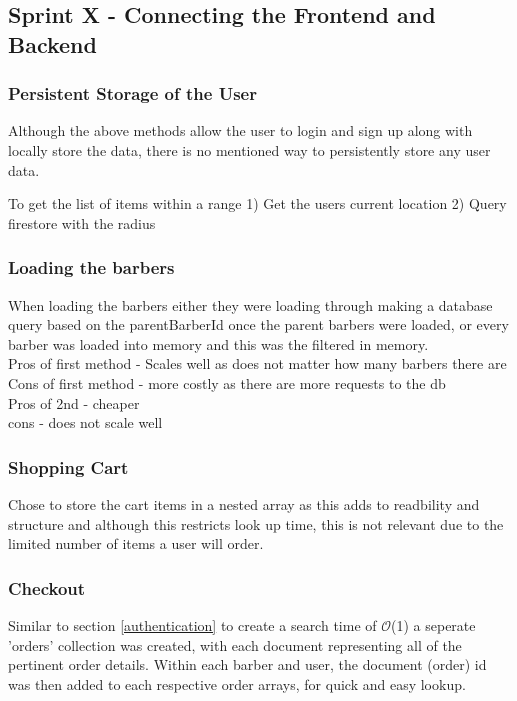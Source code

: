 \documentclass[12pt]{article}
\begin{document}
	
	
	\subsection{Sprint X - Connecting the Frontend and Backend}
	
	\subsubsection{Persistent Storage of the User}
	Although the above methods allow the user to login and sign up  along with locally store the data, there is no mentioned way to persistently store any user data.
	
	 
	
	
	To get the list of items within a range
	1) Get the users current location
	2) Query firestore with the radius
	
	\subsubsection{Loading the barbers}
	When loading the barbers either they were loading through making a database query based on the parentBarberId once the parent barbers were loaded, or every barber was loaded into memory and this was the filtered in memory.
	\\
	Pros of first method - Scales well as does not matter how many barbers there are
	\\
	Cons of first method - more costly as there are more requests to the db
	\\
	Pros of 2nd - cheaper
	\\
	cons - does not scale well
	
	\subsubsection{Shopping Cart}
	Chose to store the cart items in a nested array as this adds to readbility and structure and although this restricts look up time, this is not relevant due to the limited number of items a user will order.
	
	\subsubsection{Checkout}
	Similar to section \ref{authentication} to create a search time of $\mathcal{O}$(1) a seperate 'orders' collection was created, with each document representing all of the pertinent order details. Within each barber and user, the document (order) id was then added to each respective order arrays, for quick and easy lookup.
	
\end{document}
